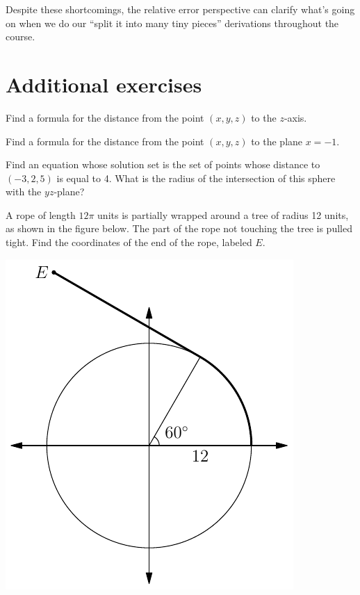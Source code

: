\documentclass{watsonbook}
\begin{document}
Despite these shortcomings, the relative error perspective can clarify
what's going on when we do our ``split it into many tiny
pieces'' derivations throughout the course. 

\newpage 

\section{Additional exercises} \label{sec:addexer}


\begin{aexercise}
  Find a formula for the distance from the point $(x,y,z)$ to the
  $z$-axis. 
\end{aexercise}

\begin{aexercise}
  Find a formula for the distance from the point $(x,y,z)$ to the
  plane $x = -1$. 
\end{aexercise}

\begin{aexercise}
  Find an equation whose solution set is the set of points whose distance to $(-3,2,5)$
  is equal to 4. What is the radius of the intersection of this sphere with the $yz$-plane?
\end{aexercise}

\begin{aexercise}
  A rope of length $12\pi$ units is partially wrapped around a tree of radius 12 units, as shown in the figure below. The part of the rope not touching the tree is pulled tight. Find the coordinates of the end of the rope, labeled $E$. 
  \begin{center}
    \includegraphics{exercisefigures/ropetree}
  \end{center}
\end{aexercise}
\end{document}

